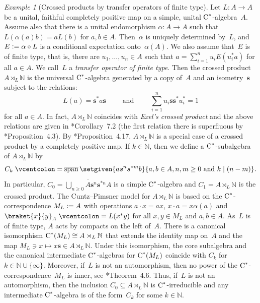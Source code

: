 \documentclass[a4paper]{amsart}
\theoremstyle{plain}
\theoremstyle{definition}
\theoremstyle{remark}
\newtheorem{example}[theorem]{Example}
\numberwithin{theorem}{section}
\numberwithin{equation}{section}
\DeclareMathOperator*{\clsp}{\overline{span}} %
\newcommand*{\nb}{\nobreakdash}
\newcommand*{\N}{\mathbb N}
\newcommand*{\Cst}{\textup C^*}%
\newcommand*{\defeq}{\mathrel{\vcentcolon=}}%
\newcommand*{\su}{\boldsymbol{s}}
\begin{document}
\begin{example}[Crossed products by transfer operators of finite type]
  \label{ex:transfer_crossed_product}
  Let \(L\colon A\to A\) be a unital, faithful completely positive
  map on a simple, unital \(\Cst\)\nb-algebra~\(A\).
  Assume also that there is a unital endomorphism \(\alpha\colon A\to
  A\) such that \(L(\alpha(a)b)=a L(b)\) for \(a,b\in A\).
  Then~\(\alpha\) is uniquely determined by~\(L\), and \(E\defeq
  \alpha\circ L\) is a conditional expectation onto~\(\alpha(A)\).
  We also assume that~\(E\) is of finite type, that is, there are
  \(u_1,\dotsc,u_n\in A\) such that \(a=\sum_{i=1}^n u_i E(u_i^*a)\)
  for all \(a\in A\).
  We call~\(L\) a \emph{transfer operator of finite type}.
  Then the crossed product \(A\rtimes_L \N\) is the universal
  \(\Cst\)\nb-algebra generated by a copy of~\(A\) and an
  isometry~\(\su\) subject to the relations:
  \[
    L(a) = \su^*a\su
    \qquad \text{ and }\qquad
    \sum_{i=1}^n u_i\su\su^*u_i^* = 1
  \]
  for all \(a\in A\).
  In fact, \(A\rtimes_L\N\)  coincides with \emph{Exel's crossed
    product} and the above relations are given in
  \cite{Exel-Vershik:Irreversible}*{Corollary~7.2} (the first relation
  there is superfluous by
  \cite{Kwasniewski:Exel_crossed}*{Proposition~4.3}).
  By \cite{Kwasniewski:Exel_crossed}*{Proposition~4.17},
  \(A\rtimes_L\N\)  is a special case of a crossed product by a
  completely positive map.
  If \(k\in \N\), then we define a \(\Cst\)\nb-subalgebra of
  \(A\rtimes_L\N\) by
  \[
    C_k\defeq
    \clsp\setgiven{a\su^n\su^{*m}b}
    {a,b\in A, n,m\ge 0  \text{ and } k \mid (n-m)}.
  \]
  In particular, \(C_0 = \overline{\bigcup_{n\ge 0} A\su^n\su^{*n}A}\)
  is a simple \(\Cst\)\nb-algebra and \(C_1=A\rtimes_L\N\) is the
  crossed product.
  The Cuntz--Pimsner model for \(A\rtimes_L\N\) is based on the
  \(\Cst\)\nb-correspondence \(M_L\defeq A\) with operations \(a\cdot
  x=a x\), \(x\cdot a=x\alpha(a)\) and \(\braket{x}{y}_A\defeq
  L(x^*y)\) for all \(x,y\in M_L\) and \(a,b\in A\).
  As~\(L\) is of finite type, \(A\) acts by compacts on the left
  of~\(A\).
  There is a canonical isomorphism \(\Cst(M_L)\cong A\rtimes_L\N\)
  that extends the identity map on~\(A\) and the map \(M_L\ni x\mapsto
  x\su\in A\rtimes_L\N\).
  Under this isomorphism, the core subalgebra and the canonical
  intermediate \(\Cst\)\nb-algebras for \(\Cst(M_L)\) coincide with
   \(C_k\) for \(k\in \N\cup \{\infty\}\).
   Moreover, if~\(L\) is not an automorphism, then no power of the
   \(\Cst\)\nb-correspondence~\(M_L\) is inner, see
   \cite{Schweizer:Dilations_correspondences}*{Theorem~4.6}.
   Thus, if~\(L\) is not an automorphism, then the inclusion
   \(C_0\subseteq A\rtimes_L\N\) is \(\Cst\)\nb-irreducible and
   any intermediate \(\Cst\)\nb-algebra is of the form~\(C_k\) for
   some \(k\in \N\).
\end{example}
\end{document}
